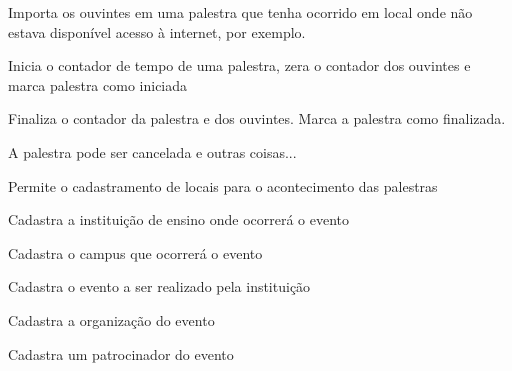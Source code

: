 \documentclass[12pt,a4paper]{article}
\begin{document}
			
        	{Importa os ouvintes em uma palestra que tenha ocorrido em local onde não estava disponível acesso à internet, por exemplo.}
        	{%
        	
        	}
			
        	{Inicia o contador de tempo de uma palestra, zera o contador dos ouvintes e marca palestra como iniciada}
        	{%
        	
        	}
			
        	{Finaliza o contador da palestra e dos ouvintes. Marca a palestra como finalizada.}
        	{%
        	
        	}
			
        	{A palestra pode ser cancelada e outras coisas...}
        	{%
        	
        	}
			
        	{Permite o cadastramento de locais para o acontecimento das palestras}
        	{%
        	
        	}
			
        	{Cadastra a instituição de ensino onde ocorrerá o evento}
        	{%
        	
        	}
					
			
        	{Cadastra o campus que ocorrerá o evento}
        	{%
        	
        	}
			
        	{Cadastra o evento a ser realizado pela instituição }
        	{%
        	
        	}
			
        	{Cadastra a organização do evento}
        	{%
        	
        	}
			
        	{Cadastra um patrocinador do evento}
        	{%
        	
        	}
			
        	{}
        	{%
        	
        	}
			
\end{document}

